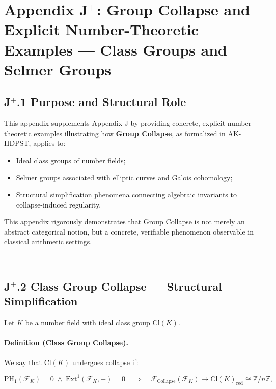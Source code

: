 \documentclass[11pt]{article}
\begin{document}
\section*{Appendix J$^{+}$: Group Collapse and Explicit Number-Theoretic Examples — Class Groups and Selmer Groups}

\subsection*{J$^{+}$.1 Purpose and Structural Role}

This appendix supplements Appendix J by providing concrete, explicit number-theoretic examples illustrating how \textbf{Group Collapse}, as formalized in AK-HDPST, applies to:

\begin{itemize}
    \item Ideal class groups of number fields;
    \item Selmer groups associated with elliptic curves and Galois cohomology;
    \item Structural simplification phenomena connecting algebraic invariants to collapse-induced regularity.
\end{itemize}

This appendix rigorously demonstrates that Group Collapse is not merely an abstract categorical notion, but a concrete, verifiable phenomenon observable in classical arithmetic settings.

---

\subsection*{J$^{+}$.2 Class Group Collapse — Structural Simplification}

Let \( K \) be a number field with ideal class group \( \mathrm{Cl}(K) \).

\paragraph{Definition (Class Group Collapse).}

We say that \( \mathrm{Cl}(K) \) undergoes collapse if:

\[
\mathrm{PH}_1(\mathcal{F}_K) = 0 \;\land\; \mathrm{Ext}^1(\mathcal{F}_K, -) = 0
\quad \Rightarrow \quad
\mathcal{F}_{\mathrm{Collapse}}(\mathcal{F}_K) \longrightarrow \mathrm{Cl}(K)_{\mathrm{red}} \cong \mathbb{Z}/n\mathbb{Z},
\]
\end{document}
